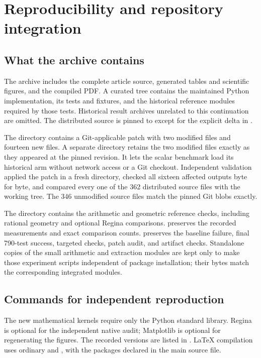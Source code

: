 \section{Reproducibility and repository integration}
\label{sec:reproduce}

\subsection{What the archive contains}

The archive includes the complete article source, generated tables and
scientific figures, and the compiled PDF. A curated  tree
contains the maintained Python implementation, its tests and fixtures, and
the historical reference modules required by those tests. Historical result
archives unrelated to this continuation are omitted. The distributed source
is pinned to \sourcepin{} except for the explicit delta in
.

The  directory contains a Git-applicable patch with two
modified files and fourteen new files. A separate  directory
retains the two modified files exactly as they appeared at the pinned
revision. It lets the scalar benchmark load its historical arm without
network access or a Git checkout. Independent validation applied the patch
in a fresh directory, checked all sixteen affected outputs byte for byte,
and compared every one of the 362 distributed source files with the working
tree. The 346 unmodified source files match the pinned Git blobs exactly.

The  directory contains the arithmetic and geometric
reference checks, including rational geometry and optional Regina
comparisons.  preserves the recorded measurements and exact
comparison counts.  preserves the baseline failure,
final 790-test success, targeted checks, patch audit, and artifact checks.
Standalone copies of the small arithmetic and extraction modules are kept
only to make those experiment scripts independent of package installation;
their bytes match the corresponding integrated modules.

\subsection{Commands for independent reproduction}

The new mathematical kernels require only the Python standard library.
Regina is optional for the independent native audit; Matplotlib is optional
for regenerating the figures. The recorded versions are listed in
. LaTeX compilation uses ordinary
 and , with the packages declared in the main
source file.

